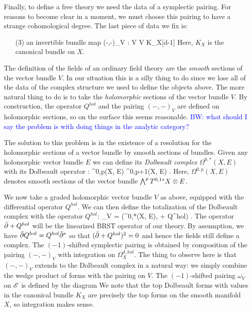 \documentclass[10pt]{amsart}
\def\brian{\textcolor{blue}{BW: }\textcolor{blue}}
\begin{document}
Finally, to define a free theory we need the data of a symplectic pairing. 
For reasons to become clear in a moment, we must choose this pairing to have a strange cohomological degree. 
The last piece of data we fix is:
\begin{itemize}
\item[(3)] an invertible bundle map
\ben
(-,-)_V : V \tensor V \to K_X[d-1]
\een
Here, $K_X$ is the canonical bundle on $X$. 
\end{itemize}

The definition of the fields of an ordinary field theory are the {\em smooth} sections of the vector bundle $V$. 
In our situation this is a silly thing to do since we lose all of the data of the complex structure we used to define the objects above.
The more natural thing to do is to take the {\em holomorphic} sections of the vector bundle $V$. 
By construction, the operator $Q^{hol}$ and the pairing $(-,-)_V$ are defined on holomorphic sections, so on the surface this seems reasonable.
\brian{what should I say the problem is with doing things in the analytic category?}

The solution to this problem is in the existence of a resolution for the holomorphic sections of a vector bundle by smooth sections of bundles. 
Given any holomorphic vector bundle $E$ we can define its {\em Dolbeault complex} $\Omega^{0,*}(X , E)$ with its Dolbeault operator 
\ben
\dbar : \Omega^{0,p}(X, E) \to \Omega^{0,p+1}(X, E) .
\een
Here, $\Omega^{0,p}(X, E)$ denotes smooth sections of the vector bundle $\bigwedge^p T^{0,1*} X \otimes E$. 

We now take a graded holomorphic vector bundle $V$ as above, equipped with the differential operator $Q^{hol}$. 
We can then define the totalization of the Dolbeault complex with the operator $Q^{hol}$:
\ben
\sE_V = \left(\Omega^{0,*}(X, E), \dbar + Q^{hol}\right) .
\een
The operator $\Bar{\partial} + Q^{hol}$ will be the linearized BRST operator of our theory.
By assumption, we have $\Bar{\partial} Q^{hol} = Q^{hol} \Bar{\partial}^*$ so that $(\Bar{\partial} + Q^{hol})^2 = 0$ and hence the fields still define a complex. 
The $(-1)$-shifted symplectic pairing is obtained by composition of the pairing $(-,-)_V$ with integration on $\Omega^{d,hol}_X$. 
The thing to observe here is that $(-,-)_V$ extends to the Dolbeault complex in a natural way: we simply combine the wedge product of forms with the pairing on $V$.
The $(-1)$-shifted pairing $\omega_V$ on $\mathscr E$ is defined by the diagram
\ben
{}
\een
We note that the top Dolbeault forms with values in the canonical bundle $K_X$ are precisely the top forms on the smooth manifold $X$, so integration makes sense. 
\end{document}
